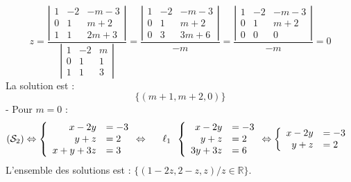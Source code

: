 {$$z = 
\frac{\left|\begin{array}{ccc}
1 & -2 & -m-3 \\
0 & 1 & m+2 \\
1 & 1 & 2 m+3
\end{array}\right|}{\left|\begin{array}{ccc}
1 & -2 & m \\
0 & 1 & 1 \\
1 & 1 & 3
\end{array}\right|}
=\frac{\left|\begin{array}{ccc}
1 & -2 & -m-3 \\
0 & 1 & m+2 \\
0 & 3 & 3 m+6
\end{array}\right|}{-m}
=\frac{\left|\begin{array}{ccc}
1 & -2 & -m-3 \\
0 & 1 & m+2 \\
0 & 0 & 0
\end{array}\right|}{-m}
=0
$$
La solution est :
$$
\{(m+1, m+2,0)\}
$$
- Pour $m=0$ :
$$
\left(\mathcal{S}_2\right) \Leftrightarrow\left\{\begin{array} { r l } 
{ x - 2 y } & { = - 3 } \\
{ y + z } & { = 2 } \\
{ x + y + 3 z } & { = 3 }
\end{array} \Leftrightarrow \quad \begin{array} { r l } 
{ \ell _ { 1 } }
\end{array} \left\{\begin{array} { r l } 
{ x - 2 y } & { = - 3 } \\
{ y + z } & { = 2 } \\
{ 3 y + 3 z } & { = 6 }
\end{array} \Leftrightarrow \left\{\begin{array}{rl}
x-2 y & =-3 \\
y+z & =2
\end{array}\right.\right.\right.
$$
L'ensemble des solutions est : $\{(1-2 z, 2-z, z) / z \in \mathbb{R}\}$. }